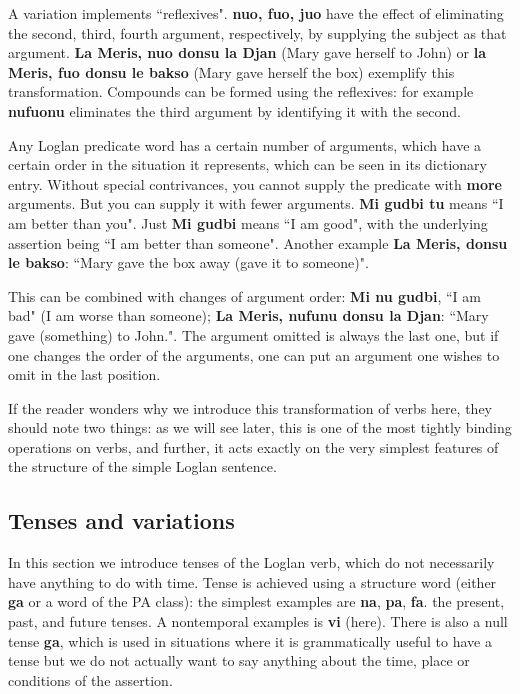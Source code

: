 \documentclass[12pt]{book}
\begin{document}
{A variation implements ``reflexives".  {\bf nuo, fuo, juo} have the effect of eliminating the second, third, fourth argument, respectively, by supplying the subject as that argument.
{\bf La Meris, nuo donsu la Djan} (Mary gave herself to John) or {\bf la Meris, fuo donsu le bakso} (Mary gave herself the box) exemplify this transformation.  Compounds can be formed using the reflexives:  for example {\bf nufuonu} eliminates the third argument by identifying it with the second.

Any Loglan predicate word has a certain number of arguments, which have a certain order in the situation it represents, which can be seen in its dictionary entry.  Without special contrivances, you cannot supply the predicate with {\bf more} arguments.  But you can supply it with fewer arguments.  {\bf Mi gudbi tu} means ``I am better than you".
Just {\bf Mi gudbi} means ``I am good", with the underlying assertion being ``I am better than someone".  Another example {\bf La Meris, donsu le bakso}:  ``Mary gave the box away (gave it to someone)".

This can be combined with changes of argument order:  {\bf Mi nu gudbi}, ``I am bad" (I am worse than someone);  {\bf La Meris, nufunu donsu la Djan}:  ``Mary gave (something) to John.".  The argument omitted is always the last one, but if one changes the order of the arguments, one can put an argument one wishes to omit in the last position.

If the reader wonders why we introduce this transformation of verbs here, they should note two things:  as we will see later, this is one of the most tightly binding operations on verbs, and further, it acts exactly on the very simplest features of the structure of the simple Loglan sentence.

\subsection{Tenses and variations}

In this section we introduce tenses of the Loglan verb, which do not necessarily have anything to do with time.  Tense is achieved using a structure word (either {\bf ga} or a word of the PA class):  the simplest examples
are {\bf na}, {\bf pa}, {\bf fa}. the present, past, and future tenses.  A nontemporal examples is {\bf vi} (here).  There is also a null tense {\bf ga}, which is used in situations where it is grammatically useful to have a tense but we do not actually want to say anything about the time, place or conditions of the assertion.

}
\end{document}
